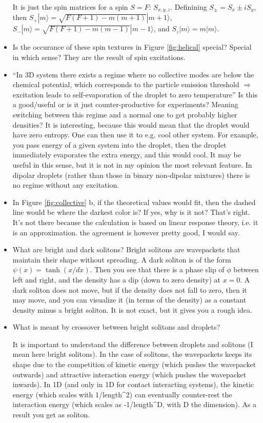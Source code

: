 \begin{itemize}
                        {\color{red} It is just the spin matrices for a spin $S=F$: $S_{x,y,z}$. Definining $S_{\pm} = S_x\pm iS_y$, 
then $S_+ |m\rangle = \sqrt{F(F+1)-m(m+1)}|m+1\rangle$,  $S_- |m\rangle = \sqrt{F(F+1)-m(m-1)}|m-1\rangle$, and $S_z |m\rangle = m|m\rangle$.
}
        \item Is the occurance of these spin textures in Figure \ref{fig:helical} special?
                        {\color{red} Special in which sense? They are the result of spin excitations.}
        \item ``In 3D system there exists a regime where no collective modes are below the chemical potential, which corresponds to the particle emission threshold $\Rightarrow$ excitation leads to self-evaporation of the droplet to zero temperature'' Is this a good/useful or is it just counter-productive for experiments? Meaning switching between this regime and a normal one to get probably higher densities?
                        {\color{red}
                        It is interesting, because this would mean that the droplet would have zero entropy. One can then use it to e.g. cool other system. For example, you pass energy of a given system into the droplet, then the droplet immediately evaporates the extra energy, and this would cool. It may be useful in this sense, but it is not in my opinion the most relevant feature. In dipolar droplets (rather than those in binary non-dipolar mixtures) there is no regime without any excitation.
}
        \item In Figure \ref{fig:collective} b, if the theoretical values would fit, then the dashed line would be where the darkest color is? If yes, why is it not?
                        {\color{red}
That's right. It's not there because the calculation is based on linear response theory, i.e. it is an approximation. the agreement 
is however pretty good, I would say.
}
        \item What are bright and dark solitons?
                        {\color{red}
                        Bright solitons are wavepackets that maintain their shape without spreading. 
A dark soliton is of the form $\psi(x) = \tanh(x/dx)$. Then you see that there is a phase slip of $\phi$ between left and right, and the density has a dip (down to zero density) at $x=0$. A dark soliton does not move, but if the density does not fall to zero, then it may move, and you can visualize it (in terms of the density) as a constant density minus a bright soliton. It is not exact, but it gives you a rough idea.
}
        \item What is meant by crossover between bright solitons and droplets?
                        {\color{red}
                        It is important to understand the difference between droplets and solitons (I mean here bright solitons). In the case of solitons, the wavepackets keeps its shape due to the competition of kinetic energy (which pushes the wavepacket outwards) and attractive interaction energy (which pushes the wavepacket inwards). In 1D (and only in 1D for contact interacting systems), the kinetic energy (which scales with 1/length^2) can eventually counter-rest the interaction energy (which scales as -1/length^D, with D the dimension). As a result you get as soliton.

}
\end{itemize}
